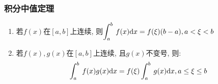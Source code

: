 \subsubsection{积分中值定理}
\begin{enumerate}
\item 若$ f(x) $在$ [a,b] $上连续, 则$ \displaystyle\int_{a}^{b}\hspace{.2em}f(x)\mathrm{d}x=f(\xi)(b-a), a<\xi<b $
\item 若$ f(x), g(x) $在$ [a,b] $上连续, 且$ g(x) $不变号, 则:
\begin{equation*}
\displaystyle\int_{a}^{b}\hspace{.2em}f(x)g(x)\mathrm{d}x=f(\xi)\displaystyle\int_{a}^{b}\hspace{.2em}g(x)\mathrm{d}x, a\le\xi\le b
\end{equation*}
\end{enumerate}
